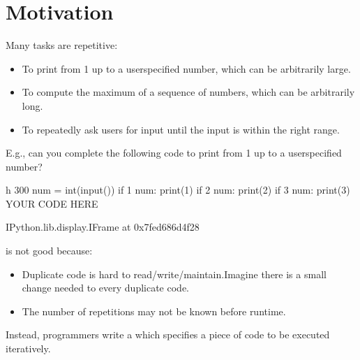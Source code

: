 \documentclass[letterpaper,10pt,english]{sphinxmanual}
\begin{document}
\section{Motivation}
\label{\detokenize{Lecture3/Iteration:motivation}}
Many tasks are repetitive:
\begin{itemize}
\item {} 
To print from 1 up to a user\sphinxhyphen{}specified number, which can be arbitrarily large.

\item {} 
To compute the maximum of a sequence of numbers, which can be arbitrarily long.

\item {} 
To repeatedly ask users for input until the input is within the right range.

\end{itemize}


E.g., can you complete the following code to print from 1 up to a user\sphinxhyphen{}specified number?

\begin{sphinxVerbatim}[commandchars=\\\{\}]
 \PYGZhy{}h 300
num = int(input(\PYGZsq{}\PYGZgt{}\PYGZsq{}))
if 1 \PYGZlt{} num: print(1)
if 2 \PYGZlt{} num: print(2)
if 3 \PYGZlt{} num: print(3)
\PYGZsh{} YOUR CODE HERE 
\end{sphinxVerbatim}

\begin{sphinxVerbatim}[commandchars=\\\{\}]
\PYGZlt{}IPython.lib.display.IFrame at 0x7fed686d4f28\PYGZgt{}
\end{sphinxVerbatim}

 is not good because:
\begin{itemize}
\item {} 
Duplicate code is hard to read/write/maintain.Imagine there is a small change needed to every duplicate code.

\item {} 
The number of repetitions may not be known before runtime.

\end{itemize}

Instead, programmers write a  which specifies a piece of code to be executed iteratively.
\end{document}
